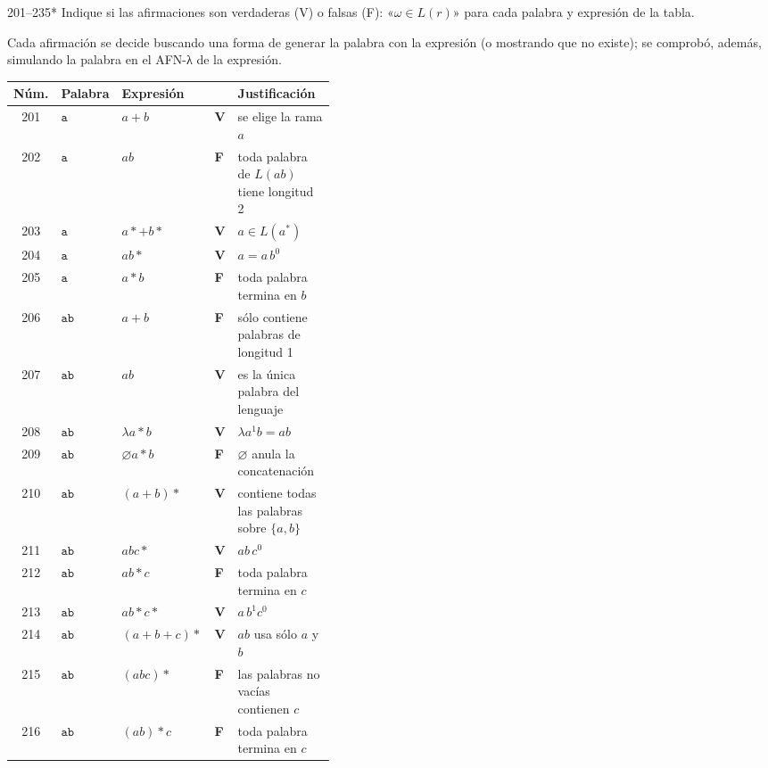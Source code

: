 \documentclass[11pt]{article}
\begin{document}


\begin{ejercicio}{201--235}{*}
Indique si las afirmaciones son verdaderas (V) o falsas (F): «$\omega \in L(r)$» para cada palabra y expresión de la tabla.
\end{ejercicio}
\proc Cada afirmación se decide buscando una forma de generar la palabra con la expresión (o mostrando que no existe); se comprobó, además, simulando la palabra en el AFN-λ de la expresión.
\begin{center}\small\begin{longtable}{clllp{0.42\linewidth}}\toprule Núm. & Palabra & Expresión & & Justificación \\\midrule\endhead
201 & $\texttt{a}$ & $a + b$ & \textbf{V} & se elige la rama $a$ \\
202 & $\texttt{a}$ & $ab$ & \textbf{F} & toda palabra de $L(ab)$ tiene longitud 2 \\
203 & $\texttt{a}$ & $a* + b*$ & \textbf{V} & $a \in L(a^*)$ \\
204 & $\texttt{a}$ & $ab*$ & \textbf{V} & $a = a\,b^0$ \\
205 & $\texttt{a}$ & $a*b$ & \textbf{F} & toda palabra termina en $b$ \\
206 & $\texttt{ab}$ & $a + b$ & \textbf{F} & sólo contiene palabras de longitud 1 \\
207 & $\texttt{ab}$ & $ab$ & \textbf{V} & es la única palabra del lenguaje \\
208 & $\texttt{ab}$ & $\lambda a*b$ & \textbf{V} & $\lambda a^1 b = ab$ \\
209 & $\texttt{ab}$ & $\varnothing a*b$ & \textbf{F} & $\varnothing$ anula la concatenación \\
210 & $\texttt{ab}$ & $(a + b)*$ & \textbf{V} & contiene todas las palabras sobre $\{a,b\}$ \\
211 & $\texttt{ab}$ & $abc*$ & \textbf{V} & $ab\,c^0$ \\
212 & $\texttt{ab}$ & $ab*c$ & \textbf{F} & toda palabra termina en $c$ \\
213 & $\texttt{ab}$ & $ab*c*$ & \textbf{V} & $a\,b^1 c^0$ \\
214 & $\texttt{ab}$ & $(a + b + c)*$ & \textbf{V} & $ab$ usa sólo $a$ y $b$ \\
215 & $\texttt{ab}$ & $(abc)*$ & \textbf{F} & las palabras no vacías contienen $c$ \\
216 & $\texttt{ab}$ & $(ab)*c$ & \textbf{F} & toda palabra termina en $c$ \\

\end{longtable}
\end{center}
\end{document}
